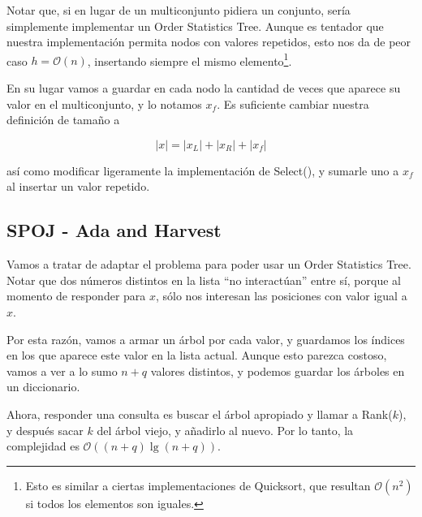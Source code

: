 Notar que, si en lugar de un multiconjunto pidiera un conjunto, sería simplemente implementar un Order Statistics Tree.
Aunque es tentador que nuestra implementación permita nodos con valores repetidos, esto nos da de peor caso \(h = \mathcal{O}(n)\), insertando siempre el mismo elemento\footnote{Esto es similar a ciertas implementaciones de Quicksort, que resultan \(\mathcal{O}(n^2)\) si todos los elementos son iguales.}.

En su lugar vamos a guardar en cada nodo la cantidad de veces que aparece su valor en el multiconjunto, y lo notamos \(x_f\). Es suficiente cambiar nuestra definición de tamaño a

\[|x| = |x_L| + |x_R| + |x_f|\]

así como modificar ligeramente la implementación de Select(), y sumarle uno a \(x_f\) al insertar un valor repetido.

\subsection{SPOJ - Ada and Harvest}


Vamos a tratar de adaptar el problema para poder usar un Order Statistics Tree.
Notar que dos números distintos en la lista ``no interactúan'' entre sí, porque al momento de responder para \(x\), 
sólo nos interesan las posiciones con valor igual a \(x\).



Por esta razón, vamos a armar un árbol por cada valor, y guardamos los índices 
en los que aparece este valor en la lista actual. 
Aunque esto parezca costoso, vamos a ver a lo sumo \(n + q\) valores distintos, y podemos guardar los árboles en un diccionario.

Ahora, responder una consulta es buscar el árbol apropiado y llamar a Rank(\(k\)), y después sacar \(k\) del árbol viejo, y añadirlo al nuevo. Por lo tanto, la complejidad es \(\mathcal{O}((n + q) \lg (n + q))\).